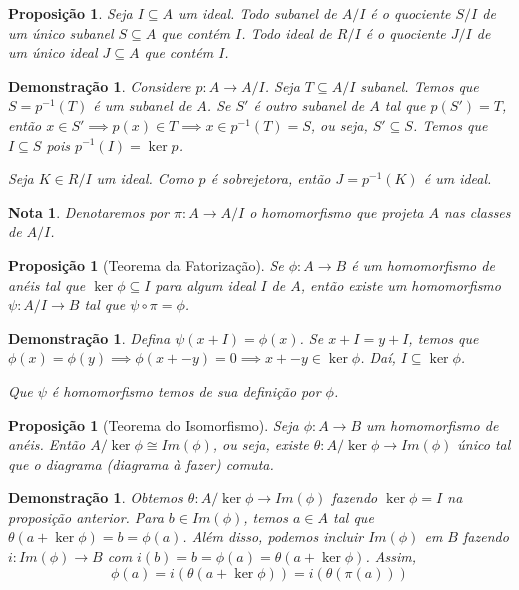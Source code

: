 \documentclass[11pt]{article}
\theoremstyle{plain}
\newtheorem{nota}[definicao]{Nota}
\newtheorem{proposicao}[definicao]{Proposição}
\theoremstyle{nonumberplain}
\newtheorem{demonstracao}[definicao]{Demonstração}
\newcommand{\inv}[1]{#1^{-1}}
\newcommand{\sseq}{\subseteq}
\begin{document}
\begin{proposicao}
    Seja $I \sseq A$ um ideal. Todo subanel de $A/I$ é o quociente $S/I$ de um único subanel $S \sseq A$ que contém $I$. Todo ideal de $R/I$ é o quociente $J/I$ de um único ideal $J \sseq A$ que contém $I$.
\end{proposicao}

\begin{demonstracao}
    Considere $p : A \to A/I$. Seja $T \sseq A/I$ subanel. Temos que $S = \inv p (T)$ é um subanel de $A$. Se $S'$ é outro subanel de $A$ tal que $p(S') = T$, então $x \in S' \implies p(x) \in T \implies x \in \inv p (T) = S$, ou seja, $S' \sseq S$. Temos que $I \sseq S$ pois $\inv p (I) = \ker p$.

    Seja $K \in R/I$ um ideal. Como $p$ é sobrejetora, então $J = \inv p (K)$ é um ideal.
\end{demonstracao}

\begin{nota}
    Denotaremos por $\pi : A \to A/I$ o homomorfismo que projeta $A$ nas classes de $A/I$.
\end{nota}

\begin{proposicao}[Teorema da Fatorização]
    Se $\phi : A \to B$ é um homomorfismo de anéis tal que $\ker \phi \sseq I$ para algum ideal $I$ de $A$, então existe um homomorfismo $\psi : A/I \to B$ tal que $\psi \circ \pi = \phi$.
\end{proposicao}

\begin{demonstracao}
    Defina $\psi(x + I) = \phi(x)$. Se $x + I = y + I$, temos que $\phi(x) = \phi(y) \implies \phi(x + -y) = 0 \implies x + -y \in \ker \phi$. Daí, $I \sseq \ker \phi$.

    Que $\psi$ é homomorfismo temos de sua definição por $\phi$.
\end{demonstracao}

\begin{proposicao}[Teorema do Isomorfismo]
    Seja $\phi : A \to B$ um homomorfismo de anéis. Então $A/\ker \phi \cong Im(\phi)$, ou seja, existe $\theta : A/\ker \phi \to Im (\phi)$ único tal que o diagrama (\textit{diagrama à fazer}) comuta.
\end{proposicao}

\begin{demonstracao}
    Obtemos $\theta : A/\ker \phi \to Im(\phi)$ fazendo $\ker \phi = I$ na proposição anterior. Para $b \in Im(\phi)$, temos $a \in A$ tal que $\theta (a + \ker \phi) = b = \phi(a)$. Além disso, podemos incluir $Im(\phi)$ em $B$ fazendo $i : Im(\phi) \to B$ com $i(b) = b = \phi(a) = \theta(a + \ker \phi)$. Assim, \begin{equation}
        \phi(a) = i(\theta (a + \ker \phi)) = i(\theta(\pi(a)))
    \end{equation}
\end{demonstracao}
\end{document}
